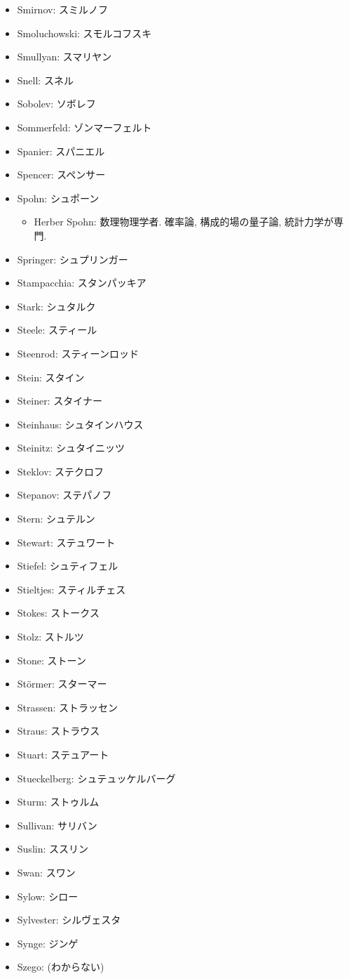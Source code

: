 \documentclass[openany, a4paper, oneside]{jsbook}
\begin{document}
\begin{itemize}
\item Smirnov: スミルノフ
\item Smoluchowski: スモルコフスキ
\item Smullyan: スマリヤン
\item Snell: スネル
\item Sobolev: ソボレフ
\item Sommerfeld: ゾンマーフェルト
\item Spanier: スパニエル
\item Spencer: スペンサー
\item Spohn: シュポーン
\begin{itemize}
\item Herber Spohn: 数理物理学者. 確率論, 構成的場の量子論, 統計力学が専門.
\end{itemize}
\item Springer: シュプリンガー
\item Stampacchia: スタンパッキア
\item Stark: シュタルク
\item Steele: スティール
\item Steenrod: スティーンロッド
\item Stein: スタイン
\item Steiner: スタイナー
\item Steinhaus: シュタインハウス
\item Steinitz: シュタイニッツ
\item Steklov: ステクロフ
\item Stepanov: ステパノフ
\item Stern: シュテルン
\item Stewart: ステュワート
\item Stiefel: シュティフェル
\item Stieltjes: スティルチェス
\item Stokes: ストークス
\item Stolz: ストルツ
\item Stone: ストーン
\item St\"ormer: スターマー
\item Strassen: ストラッセン
\item Straus: ストラウス
\item Stuart: ステュアート
\item Stueckelberg: シュテュッケルバーグ
\item Sturm: ストゥルム
\item Sullivan: サリバン
\item Suslin: ススリン
\item Swan: スワン
\item Sylow: シロー
\item Sylvester: シルヴェスタ
\item Synge: ジンゲ
\item Szego: (わからない)
\end{itemize}
\end{document}
